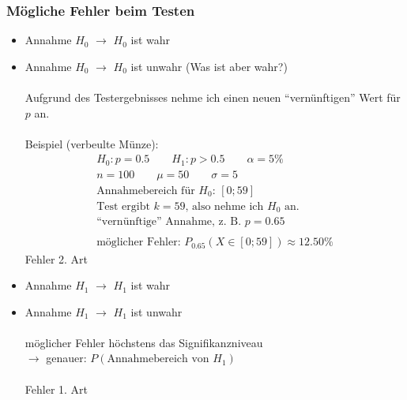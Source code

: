 \subsubsection{Mögliche Fehler beim Testen}
\begin{itemize}
  \item Annahme $H_0$ $\rightarrow$ $H_0$ ist wahr
  \item Annahme $H_0$ $\rightarrow$ $H_0$ ist unwahr (Was ist aber wahr?) \\\\
  Aufgrund des Testergebnisses nehme ich einen neuen ``vernünftigen'' Wert für $p$ an. \\\\
  Beispiel (verbeulte Münze):
  \begin{gather*}
    H_0 \colon p = 0.5 \qquad H_1 \colon p > 0.5 \qquad \alpha = 5\% \\
    n = 100 \qquad \mu = 50 \qquad \sigma = 5 \\
    \text{Annahmebereich für $H_0$: } [0; 59] \\
    \text{Test ergibt $k = 59$, also nehme ich $H_0$ an.} \\
    \text{``vernünftige'' Annahme, z. B. } p = 0.65 \\\\
    \text{möglicher Fehler: } P_{0.65}(X \in [0; 59]) \approx 12.50\%
  \end{gather*}
  Fehler 2. Art
  \item Annahme $H_1$ $\rightarrow$ $H_1$ ist wahr
  \item Annahme $H_1$ $\rightarrow$ $H_1$ ist unwahr \\\\
  möglicher Fehler höchstens das Signifikanzniveau \\
  $\rightarrow$ genauer: $P(\text{Annahmebereich von $H_1$})$ \\\\
  Fehler 1. Art
\end{itemize}
\newpage
